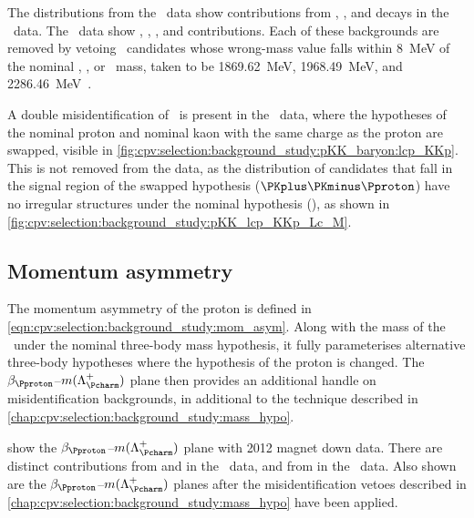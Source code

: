 The distributions from the \pKK\ data show contributions from 
\decay{\PDplus}{\PKplus\PKminus\Ppiplus}, 
\decay{\PDsplus}{\PKplus\PKminus\Ppiplus}, and 
\decay{\PLambdac}{\Pproton\PKminus\Ppiplus} decays in the \pKK\ data.
The \ppipi\ data show \decay{\PDplus}{\PKplus\Ppiminus\Ppiplus}, 
\decay{\PDplus}{\PKplus\PKminus\Ppiplus}, 
\decay{\PDsplus}{\PKplus\Ppiminus\Ppiplus}, and 
\decay{\PDsplus}{\PKplus\PKminus\Ppiplus} contributions.
Each of these backgrounds are removed by vetoing \PLambdac\ candidates whose 
wrong-mass value falls within \SI{8}{\MeV} of the nominal \PDplus, \PDsplus, or 
\PLambdac\ mass, taken to be \SI{1869.62}{\MeV}, \SI{1968.49}{\MeV}, and 
\SI{2286.46}{\MeV}~\cite{PDG2014}.

A double misidentification of \pKK\ is present in the \pKK\ data, where the 
hypotheses of the nominal proton and nominal kaon with the same charge as the 
proton are swapped, visible in 
\cref{fig:cpv:selection:background_study:pKK_baryon:lcp_KKp}.
This is not removed from the data, as the distribution of candidates that fall 
in the signal region of the swapped hypothesis ($\PKplus\PKminus\Pproton$) have 
no irregular structures under the nominal hypothesis (\pKK), as shown in 
\cref{fig:cpv:selection:background_study:pKK_lcp_KKp_Lc_M}.

\subsection{Momentum asymmetry}
\label{chap:cpv:selection:background_study:mom_asym}

The momentum asymmetry of the proton is defined in 
\cref{eqn:cpv:selection:background_study:mom_asym}.
Along with the mass of the \PLambdac\ under the nominal three-body mass 
hypothesis, it fully parameterises alternative three-body hypotheses where the 
hypothesis of the proton is changed.
The $\beta_{\Pproton}$--$m(\PLambdac)$ plane then provides an additional handle 
on misidentification backgrounds, in additional to the technique described in 
\cref{chap:cpv:selection:background_study:mass_hypo}.

show the $\beta_{\Pproton}$--$m(\PLambdac)$ plane with 2012 magnet down data.
There are distinct contributions from \decay{\PDplus}{\PKplus\PKminus\Ppiplus} 
and \decay{\PDsplus}{\PKplus\PKminus\Ppiplus} in the \pKK\ data, and from 
\decay{\PDsplus}{\PKplus\Ppiminus\Ppiplus} in the \ppipi\ data.
Also shown are the $\beta_{\Pproton}$--$m(\PLambdac)$ planes after the 
misidentification vetoes described in 
\cref{chap:cpv:selection:background_study:mass_hypo} have been applied.

